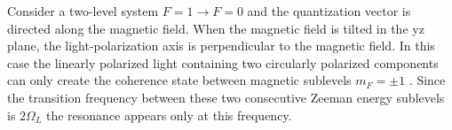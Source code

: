 Consider a two-level system $F=1\rightarrow F=0$ and the quantization vector is directed along the magnetic field. When the magnetic field is tilted in the yz plane, the light-polarization axis is perpendicular to the magnetic field. In this case the linearly polarized light containing two circularly polarized components can only create the coherence state between magnetic sublevels $m_F=\pm 1$ . Since the transition frequency between these two consecutive Zeeman energy sublevels is $2\Omega_L$  the resonance appears only at this frequency. 

 
